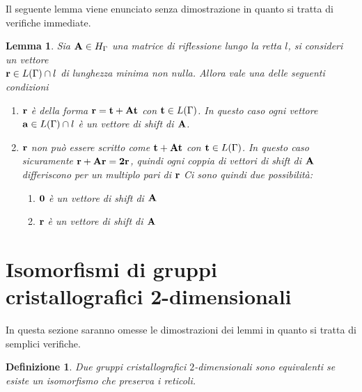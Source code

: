 \documentclass[a4paper,11pt,openright,twoside	]{book}
\newtheorem{definition}{Definizione}[section]
\newtheorem{lemma}[theorem]{Lemma}
\begin{document}
Il seguente lemma viene enunciato senza dimostrazione in quanto si tratta di verifiche immediate. 
\begin{lemma}
\label{lemma:shift2}
Sia $\vb{A} \in H_{\Gamma}$ una matrice di riflessione lungo la retta $l$, si consideri un vettore \\
$\vb{r} \in L(\Gamma) \cap l$ di lunghezza minima non nulla. Allora vale una delle seguenti condizioni
\begin{enumerate}
\item $\vb{r}$ è della forma $\vb{r} = \vb{t + At}$ con $\vb{t} \in L(\Gamma)$. In questo caso ogni vettore $\vb{a} \in L(\Gamma) \cap l$ è un vettore di shift di $\vb{A}$. 
\item $\vb{r}$ non può essere scritto come  $\vb{t + At}$ con $\vb{t} \in L(\Gamma)$. In questo caso sicuramente $\vb{r} + \vb{Ar} = \vb{2r}$, quindi ogni coppia di vettori di shift di $\vb{A}$ differiscono per un multiplo pari di $\vb{r}$
 Ci sono quindi due possibilità:
\begin{enumerate}
\item $\vb{0}$ è un vettore di shift di $\vb{A}$
\item $\vb{r}$ è un vettore di shift di $\vb{A}$
\end{enumerate}
\end{enumerate}
\end{lemma}

\section{Isomorfismi di gruppi cristallografici 2-dimensionali}
In questa sezione saranno omesse le dimostrazioni dei lemmi in quanto si tratta di semplici verifiche. 
\begin{definition}
Due gruppi cristallografici $2$-dimensionali sono equivalenti se esiste un isomorfismo che preserva i reticoli. 
\end{definition}
\end{document}
